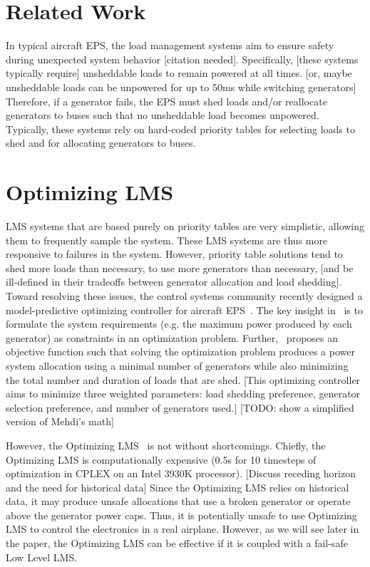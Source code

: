 \documentclass{acm_proc_article-sp}
\begin{document}
\section{Related Work}
\label{sec:related-work}
In typical aircraft EPS, the load management systems aim to ensure safety during unexpected system behavior [citation needed].
Specifically, [these systems typically require] unsheddable loads to remain powered at all times. [or, maybe unsheddable loads can be unpowered for up to 50ms while switching generators]
Therefore, if a generator fails, the EPS must shed loads and/or reallocate generators to buses such that no unsheddable load becomes unpowered.
Typically, these systems rely on hard-coded priority tables for selecting loads to shed and for allocating generators to buses.

\section{Optimizing LMS}
\label{sec:optimizing-LMS}
LMS systems that are based purely on priority tables are very simplistic, allowing them to frequently sample the system. These LMS systems are thus more
responsive to failures in the system.
However, priority table solutions tend to shed more loads than necessary, to use more generators than necessary, [and be ill-defined in their tradeoffs between generator allocation and load shedding].
Toward resolving these issues, the control systems community recently designed a model-predictive optimizing controller for aircraft EPS~\cite{mehdi}.
The key insight in~\cite{mehdi} is to formulate the system requirements (e.g. the maximum power produced by each generator) as constraints in an optimization problem.
Further,~\cite{mehdi} proposes an objective function such that solving the optimization problem produces a power system allocation using a minimal number of generators while also minimizing the total number and duration of loads that are shed. 
[This optimizing controller aims to minimize three weighted parameters: load shedding preference, generator selection preference, and number of generators used.]
[TODO: show a simplified version of Mehdi's math]

However, the Optimizing LMS~\cite{mehdi} is not without shortcomings.
Chiefly, the Optimizing LMS is computationally expensive (0.5s for 10 timesteps of optimization in CPLEX on an Intel 3930K processor).
[Discuss receding horizon and the need for historical data]
Since the Optimizing LMS relies on historical data, it may produce unsafe allocations that use a broken generator or operate above the generator power caps.
Thus, it is potentially unsafe to use Optimizing LMS to control the electronics in a real airplane. 
However, as we will see later in the paper, the Optimizing LMS can be effective if it is coupled with a fail-safe Low Level LMS.
\end{document}
